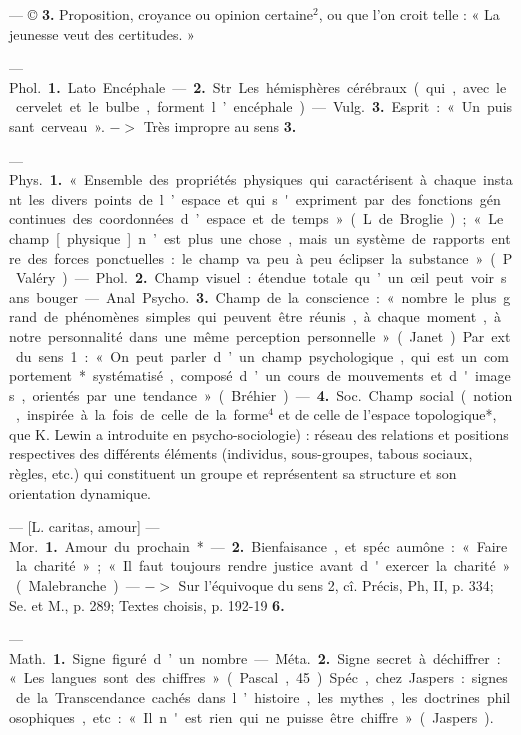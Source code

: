 \begin{itemize}[leftmargin=1cm, label=, itemsep=11pt]
— ©  {\bf 3.} Proposition, croyance
ou opinion certaine$^2$, ou que l’on
croit telle : « La jeunesse veut des
certitudes. »

 — \si{Phol.} {\bf 1.} Lato. Encéphale.
—  {\bf 2.} Str. Les hémisphères cérébraux
(qui, avec le cervelet et le bulbe, forment l’encéphale).

— \si{Vulg.}  {\bf 3.} Esprit : « Un puissant cerveau ». $->$ Très impropre
au sens  {\bf 3.}


 — \si{Phys.} {\bf 1.} « Ensemble des
propriétés physiques qui caractérisent à chaque instant les divers
points de l’espace et qui s'expriment
par des fonctions gén. continues des
coordonnées d’espace et de temps »
(L. de Broglie); « Le champ [physique] n’est plus une chose, mais un
système de rapports entre des forces
ponctuelles : le champ va peu à peu
éclipser la substance » (P. Valéry).
— \si{Phol.}  {\bf 2.} Champ visuel : étendue totale qu’un œil peut voir sans bouger.

— Anal. \si{Psycho.}  {\bf 3.} Champ de la
conscience : « nombre le plus grand
de phénomènes simples qui peuvent
être réunis, à chaque moment, à
notre personnalité dans une même
perception personnelle » (Janet).
Par ext. du sens 1 : « On peut parler
d’un champ psychologique, qui est
un comportement*  systématisé,
composé d’un cours de mouvements
et d'images, orientés par une tendance » (Bréhier). —  {\bf 4.} \si{Soc.} Champ
social (notion, inspirée à la fois de
celle de la forme$^4$ et de celle de
l’espace topologique*, que K. Lewin
a introduite en psycho-sociologie) :
réseau des relations et positions respectives des différents éléments
(individus, sous-groupes, tabous sociaux, règles, etc.) qui constituent
un groupe et représentent sa structure et son orientation dynamique.

 — [L. caritas, amour] — \si{Mor.} {\bf 1.}
Amour du prochain*. —  {\bf 2.} Bienfaisance, et spéc. aumône : « Faire la
charité »; « Il faut toujours rendre
justice avant d'exercer la charité »
(Malebranche). — $->$ Sur l'équivoque du sens 2, cî. Précis, Ph, II,
p. 334; Se. et M., p. 289; Textes
choisis, p. 192-19 {\bf 6.}

 — \si{Math.} {\bf 1.} Signe figuré d’un
nombre. — \si{Méta.}  {\bf 2.} Signe secret à
déchiffrer : « Les langues sont des
chiffres » (Pascal, 45). Spéc., chez
Jaspers : signes de la Transcendance
cachés dans l’histoire, les mythes,
les doctrines philosophiques, etc. :
« Il n'est rien qui ne puisse être
chiffre » (Jaspers).


\end{itemize}
